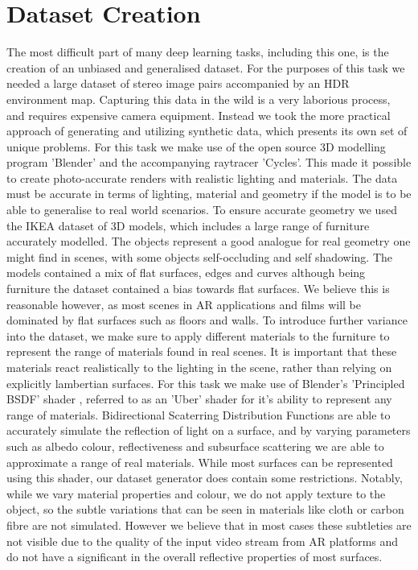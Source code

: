 \documentclass[ %
                    author={Gavin Parker},
                supervisor={Dr. Neill Campbell},
                    degree={MEng},
                     title={Deep Siamese Networks for Illumination Estimation from Stereo Images},
                  subtitle={},
                      type={research},
                      year={2018} ]{dissertation}
\begin{document}
\section{Dataset Creation}
The most difficult part of many deep learning tasks, including this one, is the creation of an unbiased and generalised dataset. For the purposes of this task we needed a large dataset of stereo image pairs accompanied by an HDR environment map. Capturing this data in the wild is a very laborious process, and requires expensive camera equipment. Instead we took the more practical approach of generating and utilizing synthetic data, which presents its own set of unique problems. For this task we make use of the open source 3D modelling program 'Blender' and the accompanying raytracer 'Cycles'. This made it possible to create photo-accurate renders with realistic lighting and materials. The data must be accurate in terms of lighting, material and geometry if the model is to be able to generalise to real world scenarios. To ensure accurate geometry we used the IKEA dataset \cite{lpt2013ikea} of 3D models, which includes a large range of furniture accurately modelled. The objects represent a good analogue for real geometry one might find in scenes, with some objects self-occluding and self shadowing. The models contained a mix of flat surfaces, edges and curves although being furniture the dataset contained a bias towards flat surfaces. We believe this is reasonable however, as most scenes in AR applications and films will be dominated by flat surfaces such as floors and walls.
\newline
To introduce further variance into the dataset, we make sure to apply different materials to the furniture to represent the range of materials found in real scenes. It is important that these materials react realistically to the lighting in the scene, rather than relying on explicitly lambertian surfaces. For this task we make use of Blender's 'Principled BSDF' shader \cite{principled_BSDF} , referred to as an 'Uber' shader for it's ability to represent any range of materials. Bidirectional Scaterring Distribution Functions are able to accurately simulate the reflection of light on a surface, and by varying parameters such as albedo colour, reflectiveness and subsurface scattering we are able to approximate a range of real materials. While most surfaces can be represented using this shader, our dataset generator does contain some restrictions. Notably, while we vary material properties and colour, we do not apply texture to the object, so the subtle variations that can be seen in materials like cloth or carbon fibre are not simulated. However we believe that in most cases these subtleties are not visible due to the quality of the input video stream from AR platforms and do not have a significant in the overall reflective properties of most surfaces.
\end{document}
